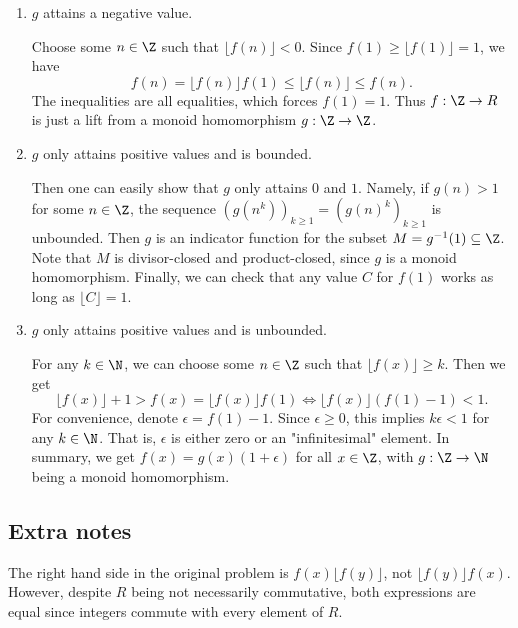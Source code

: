 \begin{enumerate}

    \item 
    $g$ attains a negative value.

    Choose some $n \in \Z$ such that $\lfloor f(n) \rfloor < 0$.
    Since $f(1) \geq \lfloor f(1) \rfloor = 1$, we have
    \[ f(n) = \lfloor f(n) \rfloor f(1) \leq \lfloor f(n) \rfloor \leq f(n). \]
    The inequalities are all equalities, which forces $f(1) = 1$.
    Thus $f : \Z \to R$ is just a lift from a monoid homomorphism $g : \Z \to \Z$.

    \item
    $g$ only attains positive values and is bounded.

    Then one can easily show that $g$ only attains $0$ and $1$.
    Namely, if $g(n) > 1$ for some $n \in \Z$, the sequence $(g(n^k))_{k \geq 1} = (g(n)^k)_{k \geq 1}$ is unbounded.
    Then $g$ is an indicator function for the subset $M = g^{-1}(1) \subseteq \Z$.
    Note that $M$ is divisor-closed and product-closed, since $g$ is a monoid homomorphism.
    Finally, we can check that any value $C$ for $f(1)$ works as long as $\lfloor C \rfloor = 1$.

    \item
    $g$ only attains positive values and is unbounded.

    For any $k \in \N$, we can choose some $n \in \Z$ such that $\lfloor f(x) \rfloor \geq k$.
    Then we get
    \[ \lfloor f(x) \rfloor + 1 > f(x) = \lfloor f(x) \rfloor f(1) \iff \lfloor f(x) \rfloor (f(1) - 1) < 1. \]
    For convenience, denote $\epsilon = f(1) - 1$.
    Since $\epsilon \geq 0$, this implies $k \epsilon < 1$ for any $k \in \N$.
    That is, $\epsilon$ is either zero or an "infinitesimal" element.
    In summary, we get $f(x) = g(x) (1 + \epsilon)$ for all $x \in \Z$, with $g : \Z \to \N$ being a monoid homomorphism.

\end{enumerate}



\subsection*{Extra notes}

The right hand side in the original problem is $f(x) \lfloor f(y) \rfloor$, not $\lfloor f(y) \rfloor f(x)$.
However, despite $R$ being not necessarily commutative, both expressions are equal since integers commute with every element of $R$.

